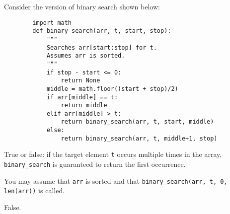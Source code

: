 \begin{prob}
    Consider the version of binary search shown below:

    \begin{verbatim}
        import math
        def binary_search(arr, t, start, stop):
            """
            Searches arr[start:stop] for t.
            Assumes arr is sorted.
            """
            if stop - start <= 0:
                return None
            middle = math.floor((start + stop)/2)
            if arr[middle] == t:
                return middle
            elif arr[middle] > t:
                return binary_search(arr, t, start, middle)
            else:
                return binary_search(arr, t, middle+1, stop)
    \end{verbatim}

    True or false: if the target element \texttt{t} occurs multiple times
    in the array, \texttt{binary_search} is guaranteed to return the first
    occurrence.

    You may assume that \texttt{arr} is sorted and that
    \texttt{binary_search(arr, t, 0, len(arr))} is called.

    \tF{}

    \begin{soln}
        False.
    \end{soln}

\end{prob}
